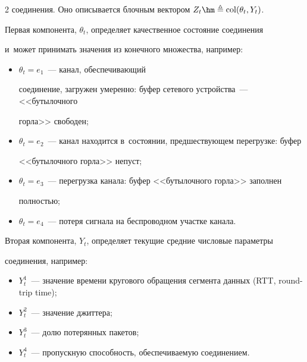 \begin{multicols}{2}
соединения. Оно описывается блочным вектором $Z_t \hm\ebd \mathrm{col}(\theta_t, Y_t)$. 


Первая компонента, $\theta_t$, определяет качественное состояние соединения 


и~может принимать значения из конечного множества, например:


\begin{itemize}


\item


$\theta_t=e_1$~--- канал, обеспечивающий


 соединение, загружен умеренно: буфер сетевого устройства~--- <<бутылочного 


горла>> свободен;


\item


$\theta_t=e_2$~--- канал находится в~состоянии, предшествующем перегрузке: буфер 


<<бутылочного горла>> непуст;


\item


$\theta_t=e_3$~--- перегрузка канала: буфер <<бутылочного горла>> заполнен 


полностью;


\item


$\theta_t=e_4$~--- потеря сигнала на беспроводном участке канала.


\end{itemize}


Вторая компонента, $Y_t$, определяет текущие средние числовые параметры 


соединения, например:


\begin{itemize}


\item


$Y_t^1$~--- значение времени кругового обращения сегмента данных (RTT, round-trip time);


\item[--]


$Y_t^2$~--- значение джиттера;


\item


$Y_t^3$~--- долю потерянных пакетов;


\item


$Y_t^4$~--- пропускную способность, обес\-пе\-чи\-ва\-емую соединением.



\end{itemize}
\end{multicols}
